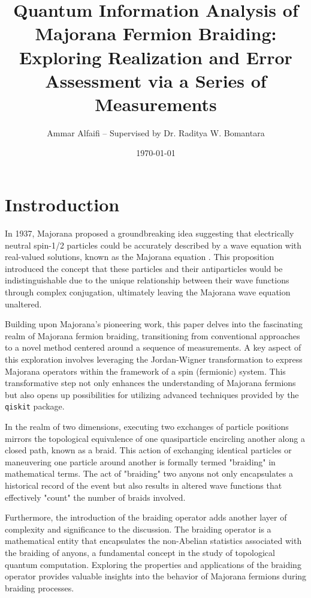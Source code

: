 \documentclass{article}
\title{Quantum Information Analysis of Majorana Fermion Braiding: Exploring Realization and Error Assessment via a Series of Measurements}
\author{Ammar Alfaifi -- Supervised by Dr. Raditya W. Bomantara}
\date{\today}
\def\c#1{\texttt{#1}}
\begin{document}
\maketitle

\section{Instroduction} %
\label{sec:Instroduction}
In 1937, Majorana proposed a groundbreaking idea suggesting that electrically neutral spin-1/2 particles could be accurately described by a wave equation with real-valued solutions, known as the Majorana equation \cite{Majorana2006}. This proposition introduced the concept that these particles and their antiparticles would be indistinguishable due to the unique relationship between their wave functions through complex conjugation, ultimately leaving the Majorana wave equation unaltered.

Building upon Majorana's pioneering work, this paper delves into the fascinating realm of Majorana fermion braiding, transitioning from conventional approaches to a novel method centered around a sequence of measurements. A key aspect of this exploration involves leveraging the Jordan-Wigner transformation to express Majorana operators within the framework of a spin (fermionic) system. This transformative step not only enhances the understanding of Majorana fermions but also opens up possibilities for utilizing advanced techniques provided by the \c{qiskit} package.

In the realm of two dimensions, executing two exchanges of particle positions mirrors the topological equivalence of one quasiparticle encircling another along a closed path, known as a braid. This action of exchanging identical particles or maneuvering one particle around another is formally termed "braiding" in mathematical terms. The act of "braiding" two anyons not only encapsulates a historical record of the event but also results in altered wave functions that effectively "count" the number of braids involved.\cite{Nakamura_2020}

Furthermore, the introduction of the braiding operator adds another layer of complexity and significance to the discussion. The braiding operator is a mathematical entity that encapsulates the non-Abelian statistics associated with the braiding of anyons, a fundamental concept in the study of topological quantum computation. Exploring the properties and applications of the braiding operator provides valuable insights into the behavior of Majorana fermions during braiding processes.
\end{document}
